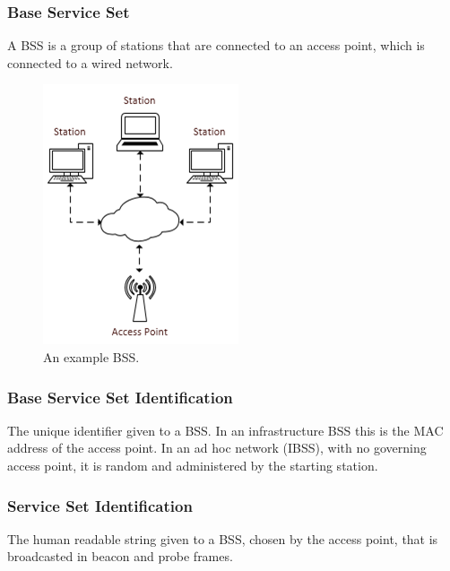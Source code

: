 \subsubsection*{Base Service Set}
A BSS is a group of stations that are connected to an access point, which is connected to a wired network.

\begin{figure}[htb!]

\centering\includegraphics{intro/diagrams/bss.png}
\caption{An example BSS.}

\end{figure}

\subsubsection*{Base Service Set Identification}
The unique identifier given to a BSS. In an infrastructure BSS this is the MAC address of the access point. In an ad hoc network (IBSS), with no governing access point, it is random and administered by the starting station.

\subsubsection*{Service Set Identification}
The human readable  string given to a BSS, chosen by the access point, that is broadcasted in beacon and probe frames.

